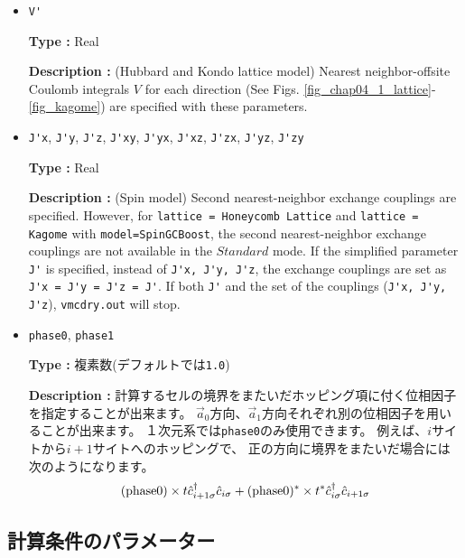 \begin{itemize}
\item \verb|V'|

{\bf Type :} Real

{\bf Description :} (Hubbard and Kondo lattice model)
Nearest neighbor-offsite Coulomb integrals $V$
 for each direction
(See Figs. \ref{fig_chap04_1_lattice}-\ref{fig_kagome})
are specified with these parameters.

\item \verb|J'x|, \verb|J'y|, \verb|J'z|, \verb|J'xy|, 
  \verb|J'yx|, \verb|J'xz|, \verb|J'zx|, \verb|J'yz|, \verb|J'zy|

{\bf Type :} Real

{\bf Description :} (Spin model)
Second nearest-neighbor exchange couplings are specified.
However, for \verb|lattice = Honeycomb Lattice| and  \verb|lattice = Kagome|
with \verb|model=SpinGCBoost|,
the second nearest-neighbor exchange couplings are not available in the $Standard$ mode.
If the simplified parameter \verb|J'| is specified, instead of
\verb|J'x, J'y, J'z|,
the exchange couplings are set as
\verb|J'x = J'y = J'z = J'|.
If both \verb|J'| and the set of the couplings (\verb|J'x, J'y, J'z|),
\verb|vmcdry.out| will stop.

\item \verb|phase0|, \verb|phase1|

  {\bf Type :} 複素数(デフォルトでは\verb|1.0|)
  
  {\bf Description :} 計算するセルの境界をまたいだホッピング項に付く位相因子を指定することが出来ます。
  $\vec{a}_0$方向、$\vec{a}_1$方向それぞれ別の位相因子を用いることが出来ます。
  １次元系では\verb|phase0|のみ使用できます。
  例えば、$i$サイトから$i+1$サイトへのホッピングで、
  正の方向に境界をまたいだ場合には次のようになります。
  \begin{align}
    ({\rm phase0}) \times t {\hat c}_{i+1 \sigma}^\dagger {\hat c}_{i \sigma}
    + ({\rm phase0})^* \times t^* {\hat c}_{i \sigma}^\dagger {\hat c}_{i+1 \sigma}
  \end{align}

\end{itemize}

\subsection{計算条件のパラメーター}

